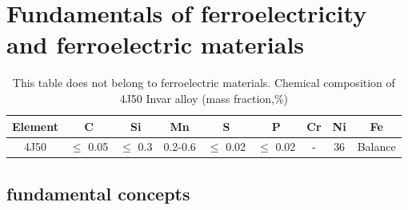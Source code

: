 \documentclass[a4paper,fleqn]{cas-sc}
\begin{document}
\section{Fundamentals of ferroelectricity and ferroelectric materials}\label{materials}

\begin{table}[h]   
    \caption{\label{table-material1} This table does not belong to ferroelectric materials. Chemical composition of 4J50 Invar alloy (mass fraction,\%)}
    \centering
 \begin{tabular*}{12cm}{ccccccccc} 
   \toprule  
    Element & C & Si & Mn & S & P &Cr &Ni  & Fe       \\   
    \midrule  
    4J50  & $\leq$ 0.05   & $\leq$ 0.3     & 0.2-0.6    & $\leq$ 0.02   & $\leq$ 0.02  &-   &  36   & Balance \\
    \bottomrule 
    \end{tabular*}
    \end{table}

\subsection{fundamental concepts}\label{laser-welding-experiment}
\end{document}
